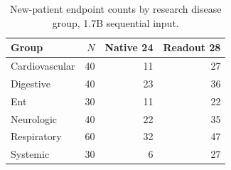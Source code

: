 \begin{table}[H]\centering\small
\begin{tabular}{lrrr}\toprule
Group & $N$ & Native 24 & Readout 28\\\midrule
Cardiovascular & 40 & 11 & 27\\
Digestive & 40 & 23 & 36\\
Ent & 30 & 11 & 22\\
Neurologic & 40 & 22 & 35\\
Respiratory & 60 & 32 & 47\\
Systemic & 30 & 6 & 27\\
\bottomrule\end{tabular}
\caption{New-patient endpoint counts by research disease group, 1.7B sequential input.}\end{table}
